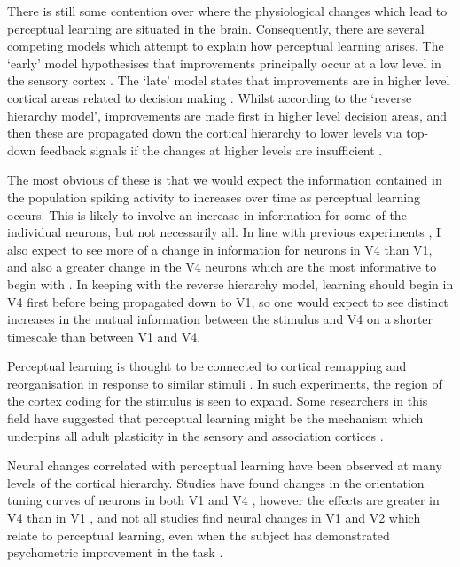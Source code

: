 There is still some contention over where the physiological changes which lead to perceptual learning are situated in the brain.
Consequently, there are several competing models which attempt to explain how perceptual learning arises.
The `early' model hypothesises that improvements principally occur at a low level in the sensory cortex \citep{Gilbert2001,Fahle2005}.
The `late' model states that improvements are in higher level cortical areas related to decision making \citep{Yu2004}.
Whilst according to the `reverse hierarchy model', improvements are made first in higher level decision areas, and then these are propagated down the cortical hierarchy to lower levels via top-down feedback signals if the changes at higher levels are insufficient \citep{Ahissar2004,Hochstein2002}.

The most obvious of these is that we would expect the information contained in the population spiking activity to increases over time as perceptual learning occurs.
This is likely to involve an increase in information for some of the individual neurons, but not necessarily all.
In line with previous experiments \citep{Raiguel2006}, I also expect to see more of a change in information for neurons in \ac{V4} than \ac{V1}, and also a greater change in the \ac{V4} neurons which are the most informative to begin with \citep{Raiguel2006}.
In keeping with the reverse hierarchy model, learning should begin in \ac{V4} first before being propagated down to \ac{V1}, so one would expect to see distinct increases in the mutual information between the stimulus and \ac{V4} on a shorter timescale than between \ac{V1} and \ac{V4}.

Perceptual learning is thought to be connected to cortical remapping and reorganisation in response to similar stimuli \citep{Dinse2003,Pleger2003,Polley2006}.
In such experiments, the region of the cortex coding for the stimulus is seen to expand.
Some researchers in this field have suggested that perceptual learning might be the mechanism which underpins all adult plasticity in the sensory and association cortices \citep{Gilbert2001}.


Neural changes correlated with perceptual learning have been observed at many levels of the cortical hierarchy.
Studies have found changes in the orientation tuning curves of neurons in both \ac{V1} \citep{Schoups2001} and \ac{V4} \citep{Yang2004,Raiguel2006}, however the effects are greater in \ac{V4} than in \ac{V1} \citep{Raiguel2006}, and not all studies find neural changes in \ac{V1} and \ac{V2} which relate to perceptual learning, even when the subject has demonstrated psychometric improvement in the task \citep{Ghose2002}.

